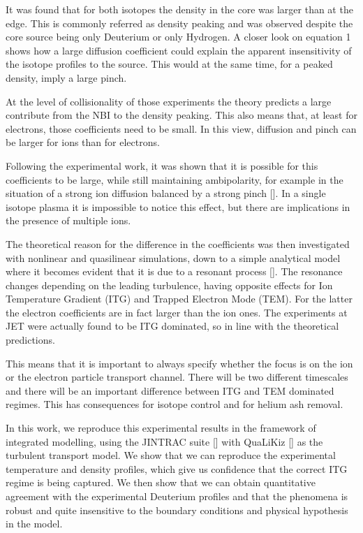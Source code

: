 \documentclass[a4paper,10pt]{iopart}
\begin{document}
It was found that for both isotopes the density in the core was larger than at the edge. This is commonly referred as density peaking and was observed despite the core source being only Deuterium or only Hydrogen. A closer look on equation 1 shows how a large diffusion coefficient could explain the apparent insensitivity of the isotope profiles to the source. This would at the same time, for a peaked density, imply a large pinch.

At the level of collisionality of those experiments the theory predicts a large contribute from the NBI to the density peaking. This also means that, at least for electrons, those coefficients need to be small. In this view, diffusion and pinch can be larger for ions than for electrons.

Following the experimental work, it was shown that it is possible for this coefficients to be large, while still maintaining ambipolarity, for example in the situation of a strong ion diffusion balanced by a strong pinch []. In a single isotope plasma it is impossible to notice this effect, but there are implications in the presence of multiple ions.

The theoretical reason for the difference in the coefficients was then investigated with nonlinear and quasilinear simulations, down to a simple analytical model where it becomes evident that it is due to a resonant process []. The resonance changes depending on the leading turbulence, having opposite effects for Ion Temperature Gradient (ITG) and Trapped Electron Mode (TEM). For the latter the electron coefficients are in fact larger than the ion ones. The experiments at JET were actually found to be ITG dominated, so in line with the theoretical predictions.

This means that it is important to always specify whether the focus is on the ion or the electron particle transport channel. There will be two different timescales and there will be an important difference between ITG and TEM dominated regimes. This has consequences for isotope control and for helium ash removal.

In this work, we reproduce this experimental results in the framework of integrated modelling, using the JINTRAC suite [] with QuaLiKiz [] as the turbulent transport model. We show that we can reproduce the experimental temperature and density profiles, which give us confidence that the correct ITG regime is being captured. We then show that we can obtain quantitative agreement with the experimental Deuterium profiles and that the phenomena is robust and quite insensitive to the boundary conditions and physical hypothesis in the model.
\end{document}
